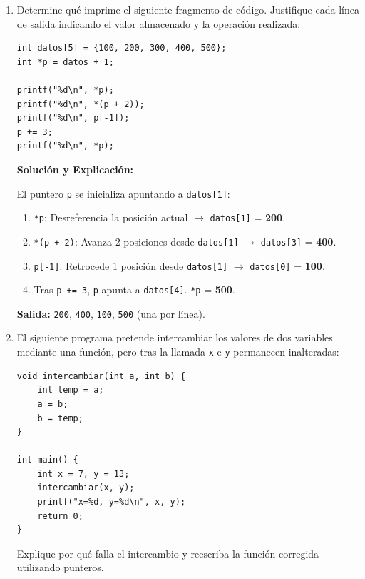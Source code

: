 \documentclass[11pt,letterpaper]{article}
\begin{document}
\begin{enumerate}[label=\textbf{\arabic*.}]
    \begin{enumerate}[label=(\alph*)]
        \item Determine qué imprime el siguiente fragmento de código. Justifique cada línea de salida indicando el valor almacenado y la operación realizada:
        \begin{lstlisting}[style=customc]
int datos[5] = {100, 200, 300, 400, 500};
int *p = datos + 1;

printf("%d\n", *p);
printf("%d\n", *(p + 2));
printf("%d\n", p[-1]);
p += 3;
printf("%d\n", *p);
        \end{lstlisting}

        \begin{solucionbox}
        \textbf{Solución y Explicación:}

        \noindent El puntero \texttt{p} se inicializa apuntando a \texttt{datos[1]}:
        \begin{enumerate}[noitemsep]
            \item \texttt{*p}: Desreferencia la posición actual $\rightarrow$ \texttt{datos[1]} = \textbf{200}.
            \item \texttt{*(p + 2)}: Avanza 2 posiciones desde \texttt{datos[1]} $\rightarrow$ \texttt{datos[3]} = \textbf{400}.
            \item \texttt{p[-1]}: Retrocede 1 posición desde \texttt{datos[1]} $\rightarrow$ \texttt{datos[0]} = \textbf{100}.
            \item Tras \texttt{p += 3}, \texttt{p} apunta a \texttt{datos[4]}. \texttt{*p} = \textbf{500}.
        \end{enumerate}
        \noindent \textbf{Salida:} \texttt{200}, \texttt{400}, \texttt{100}, \texttt{500} (una por línea).
        \end{solucionbox}

        \vspace{0.3cm}
        \item El siguiente programa pretende intercambiar los valores de dos variables mediante una función, pero tras la llamada \texttt{x} e \texttt{y} permanecen inalteradas:
        \begin{lstlisting}[style=customc]
void intercambiar(int a, int b) {
    int temp = a;
    a = b;
    b = temp;
}

int main() {
    int x = 7, y = 13;
    intercambiar(x, y);
    printf("x=%d, y=%d\n", x, y);
    return 0;
}
        \end{lstlisting}
        Explique por qué falla el intercambio y reescriba la función corregida utilizando punteros.


\end{enumerate}
\end{enumerate}
\end{document}

